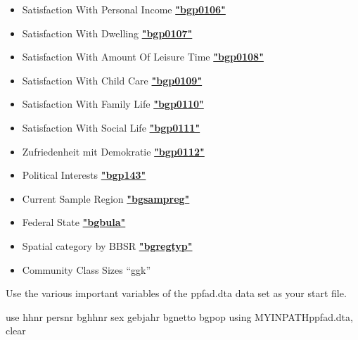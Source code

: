 \documentclass[letterpaper,10pt,openany,onesideH,english]{sphinxmanual}
\begin{document}
\begin{itemize}
\item {} 
Satisfaction With Personal Income  \href{https://paneldata.org/soep-core/data/bgp/bgp0106}{\textbf{"bgp0106"}}

\item {} 
Satisfaction With Dwelling  \href{https://paneldata.org/soep-core/data/bgp/bgp0107}{\textbf{"bgp0107"}}

\item {} 
Satisfaction With Amount Of Leisure Time  \href{https://paneldata.org/soep-core/data/bgp/bgp0108}{\textbf{"bgp0108"}}

\item {} 
Satisfaction With Child Care  \href{https://paneldata.org/soep-core/data/bgp/bgp0109}{\textbf{"bgp0109"}}

\item {} 
Satisfaction With Family Life  \href{https://paneldata.org/soep-core/data/bgp/bgp0110}{\textbf{"bgp0110"}}

\item {} 
Satisfaction With Social Life  \href{https://paneldata.org/soep-core/data/bgp/bgp0111}{\textbf{"bgp0111"}}

\item {} 
Zufriedenheit mit Demokratie  \href{https://paneldata.org/soep-core/data/bgp/bgp0112}{\textbf{"bgp0112"}}

\item {} 
Political Interests  \href{https://paneldata.org/soep-core/data/bgp/bgp143}{\textbf{"bgp143"}}

\item {} 
Current Sample Region  \href{https://paneldata.org/soep-core/data/bghbrutto/bgsampreg}{\textbf{"bgsampreg"}}

\item {} 
Federal State  \href{https://paneldata.org/soep-core/data/bghbrutto/bgbula}{\textbf{"bgbula"}}

\item {} 
Spatial category by BBSR  \href{https://paneldata.org/soep-core/data/bghbrutto/bgregtyp}{\textbf{"bgregtyp"}}

\item {} 
Community Class Sizes “ggk”

\end{itemize}

Use the various important variables of the ppfad.dta data set as your start file.

%
\begin{sphinxVerbatim}[commandchars=\\\{\},numbers=left,firstnumber=1,stepnumber=1]
use hhnr persnr bghhnr sex gebjahr bgnetto bgpop using \PYGZdl{}\PYGZob{}MY\PYGZus{}IN\PYGZus{}PATH\PYGZcb{}\PYGZbs{}ppfad.dta, clear
\end{sphinxVerbatim}
\end{document}
